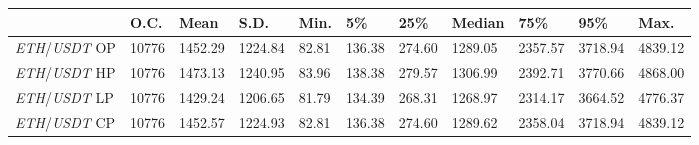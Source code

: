 \begin{tabular}{lllllllllll}
\toprule
 & \textbf{O.C.} & \textbf{Mean} & \textbf{S.D.} & \textbf{Min.} & \textbf{5\%} & \textbf{25\%} & \textbf{Median} & \textbf{75\%} & \textbf{95\%} & \textbf{Max.} \\
\midrule
\emph{ETH}/\emph{USDT} OP & 10776 & 1452.29 & 1224.84 & 82.81 & 136.38 & 274.60 & 1289.05 & 2357.57 & 3718.94 & 4839.12 \\
\emph{ETH}/\emph{USDT} HP & 10776 & 1473.13 & 1240.95 & 83.96 & 138.38 & 279.57 & 1306.99 & 2392.71 & 3770.66 & 4868.00 \\
\emph{ETH}/\emph{USDT} LP & 10776 & 1429.24 & 1206.65 & 81.79 & 134.39 & 268.31 & 1268.97 & 2314.17 & 3664.52 & 4776.37 \\
\emph{ETH}/\emph{USDT} CP & 10776 & 1452.57 & 1224.93 & 82.81 & 136.38 & 274.60 & 1289.62 & 2358.04 & 3718.94 & 4839.12 \\
\bottomrule
\end{tabular}
